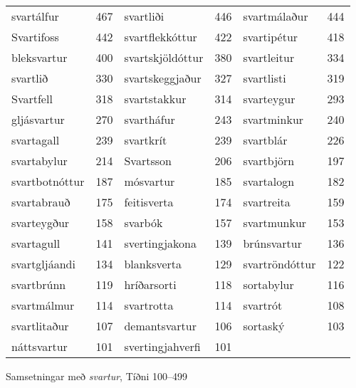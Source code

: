 \documentclass[../samsetningasafn.tex]{subfiles}
\begin{document}
\begin{wordlist}[ht!]
\begin{tcolorbox}

	\setlength{\extrarowheight}{3pt}
	\begin{tabular}{BlBlBl}
		svartálfur	& 467		& 
		svartliði	& 446		& 
		svartmálaður & 444		\\ 
		Svartifoss	& 442		& 
		svartflekkóttur & 422	& 
		svartipétur	& 418		\\ 
		bleksvartur	& 400		& 
		svartskjöldóttur & 380	& 
		svartleitur	& 334		\\ 
		svartlið	& 330		& 
		svartskeggjaður & 327	& 
		svartlisti	& 319		\\ 
		Svartfell	& 318		& 
		svartstakkur & 314		& 
		svarteygur 	& 293		\\ 
		gljásvartur	& 270		& 
		svartháfur 	& 243		& 
		svartminkur	& 240		\\ 
		svartagall	& 239		& 
		svartkrít	& 239		& 
		svartblár	& 226		\\ 
		svartabylur	& 214		& 
		Svartsson	& 206		& 
		svartbjörn	& 197		\\ 
		svartbotnóttur & 187	& 
		mósvartur	& 185		& 
		svartalogn	& 182		\\ 
		svartabrauð	& 175		&  
		feitisverta	& 174		& 
		svartreita	& 159		\\ 
		svarteygður	& 158		& 
		svarbók	& 157		& 
		svartmunkur	& 153		\\ 
		svartagull	& 141		& 
		svertingjakona & 139	& 
		brúnsvartur	& 136		\\ 
		svartgljáandi & 134		& 
		blanksverta	& 129		& 
		svartröndóttur & 122	\\ 
		svartbrúnn	& 119		& 
		hríðarsorti	& 118		& 
		sortabylur	& 116		\\ 
		svartmálmur	& 114		& 
		svartrotta	& 114		& 
		svartrót	& 108		\\ 
		svartlitaður	& 107		& 
		demantsvartur & 106	& 
		sortaský	& 103		\\ 
		náttsvartur	& 101		& 
		svertingjahverfi & 101	& 
				&
	\end{tabular}

\end{tcolorbox}
	\caption{Samsetningar með \textit{svartur}, Tíðni 100--499}
	\label{listi:svart.100}
\end{wordlist}
\end{document}
